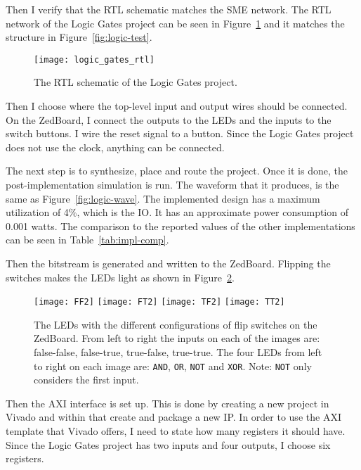 Then I verify that the RTL schematic matches the SME network. The RTL
network of the Logic Gates project can be seen in Figure~\ref{fig:logic-rtl}
and it matches the structure in Figure~\ref{fig:logic-test}.

\begin{figure}
    \texttt{[image: logic\_gates\_rtl]}
    \caption{The RTL schematic of the Logic Gates project.}
    \label{fig:logic-rtl}
\end{figure}

Then I choose where the top-level input and output wires should be
connected. On the ZedBoard, I connect the outputs to the LEDs and the
inputs to the switch buttons. I wire the reset signal to a button. Since the
Logic Gates project does not use the clock, anything can be connected.

The next step is to synthesize, place and route the project. Once it is done,
the post-implementation simulation is run. The waveform that it produces, is the
same as Figure~\ref{fig:logic-wave}. The implemented design has a maximum
utilization of 4\%, which is the IO. It has an approximate power consumption of
0.001 watts. The comparison to the reported values of the other implementations
can be seen in Table~\ref{tab:impl-comp}.

Then the bitstream is generated and written to the ZedBoard. Flipping the
switches makes the LEDs light as shown in Figure~\ref{fig:logic-fpga}.

\begin{figure}
    \texttt{[image: FF2]}
    \texttt{[image: FT2]}
    \texttt{[image: TF2]}
    \texttt{[image: TT2]}
    \caption{The LEDs with the different configurations of flip switches on the
    ZedBoard. From left to right the inputs on each of the images are:
    false-false, false-true, true-false, true-true. The four LEDs from left to
    right on each image are: \texttt{AND}, \texttt{OR}, \texttt{NOT} and
    \texttt{XOR}. Note: \texttt{NOT} only considers the first input.}
    \label{fig:logic-fpga}
\end{figure}

Then the AXI interface is set up. This is done by creating a new project in
Vivado and within that create and package a new IP. In order to use the AXI
template that Vivado offers, I need to state how many registers it should have.
Since the Logic Gates project has two inputs and four outputs, I choose six
registers.

